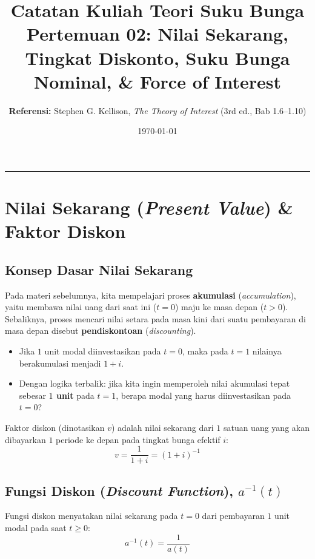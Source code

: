 \documentclass[11pt,a4paper]{article}
\title{\textbf{\LARGE Catatan Kuliah Teori Suku Bunga}\\[0.3em]
\Large Pertemuan 02: Nilai Sekarang, Tingkat Diskonto, Suku Bunga Nominal, \& Force of Interest}
\author{\textbf{Referensi:} Stephen G. Kellison, \textit{The Theory of Interest} (3rd ed., Bab 1.6--1.10)}
\date{\today}
\begin{document}
\maketitle
\tableofcontents
\vspace{1em}
\hrule
\vspace{1.5em}

\section{Nilai Sekarang (\textit{Present Value}) \& Faktor Diskon}

\subsection{Konsep Dasar Nilai Sekarang}
Pada materi sebelumnya, kita mempelajari proses \textbf{akumulasi} (\textit{accumulation}), yaitu membawa nilai uang dari saat ini ($t=0$) maju ke masa depan ($t > 0$). Sebaliknya, proses mencari nilai setara pada masa kini dari suatu pembayaran di masa depan disebut \textbf{pendiskontoan} (\textit{discounting}).
\begin{itemize}[leftmargin=1.5em]
    \item Jika $1$ unit modal diinvestasikan pada $t = 0$, maka pada $t = 1$ nilainya berakumulasi menjadi $1 + i$.
    \item Dengan logika terbalik: jika kita ingin memperoleh nilai akumulasi tepat sebesar \textbf{$1$ unit} pada $t = 1$, berapa modal yang harus diinvestasikan pada $t = 0$?
\end{itemize}

\begin{definitionbox}
Faktor diskon (dinotasikan $v$) adalah nilai sekarang dari $1$ satuan uang yang akan dibayarkan $1$ periode ke depan pada tingkat bunga efektif $i$:
\begin{equation}
    v = \frac{1}{1 + i} = (1 + i)^{-1}
\end{equation}
\end{definitionbox}

\subsection{Fungsi Diskon (\textit{Discount Function}), $a^{-1}(t)$}
Fungsi diskon menyatakan nilai sekarang pada $t = 0$ dari pembayaran $1$ unit modal pada saat $t \ge 0$:
\begin{equation}
    a^{-1}(t) = \frac{1}{a(t)}
\end{equation}
\end{document}

